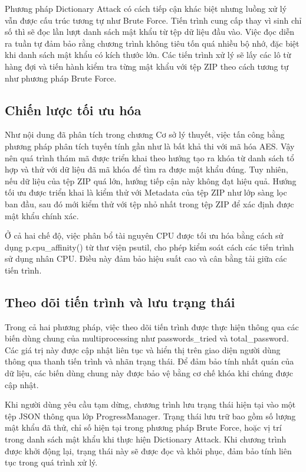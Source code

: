 \documentclass[../DoAn.tex]{subfiles}
\begin{document}
Phương pháp Dictionary Attack có cách tiếp cận khác biệt nhưng luồng xử lý vẫn được cấu trúc tương tự như Brute Force. Tiến trình cung cấp thay vì sinh chỉ số thì sẽ đọc lần lượt danh sách mật khẩu từ tệp dữ liệu đầu vào. Việc đọc diễn ra tuần tự đảm bảo rằng chương trình không tiêu tốn quá nhiều bộ nhớ, đặc biệt khi danh sách mật khẩu có kích thước lớn. Các tiến trình xử lý sẽ lấy các lô từ hàng đợi và tiến hành kiểm tra từng mật khẩu với tệp ZIP theo cách tương tự như phương pháp Brute Force.

\subsection{Chiến lược tối ưu hóa}

Như nội dung đã phân tích trong chương Cơ sở lý thuyết, việc tấn công bằng phương pháp phân tích tuyến tính gần như là bất khả thi với mã hóa AES. Vậy nên quá trình thám mã được triển khai theo hướng tạo ra khóa từ danh sách tổ hợp và thử với dữ liệu đã mã khóa để tìm ra được mật khẩu đúng. Tuy nhiên, nếu dữ liệu của tệp ZIP quá lớn, hướng tiếp cận này không đạt hiệu quả. Hướng tối ưu được triển khai là kiểm thử với Metadata của tệp ZIP như lớp sàng lọc ban đầu, sau đó mới kiểm thử với tệp nhỏ nhất trong tệp ZIP để xác định được mật khẩu chính xác. 

Ở cả hai chế độ, việc phân bổ tài nguyên CPU được tối ưu hóa bằng cách sử dụng p.cpu\_affinity() từ thư viện psutil, cho phép kiểm soát cách các tiến trình sử dụng nhân CPU. Điều này đảm bảo hiệu suất cao và cân bằng tải giữa các tiến trình.

\subsection{Theo dõi tiến trình và lưu trạng thái}

Trong cả hai phương pháp, việc theo dõi tiến trình được thực hiện thông qua các biến dùng chung của multiprocessing như passwords\_tried và total\_password. Các giá trị này được cập nhật liên tục và hiển thị trên giao diện người dùng thông qua thanh tiến trình và nhãn trạng thái. Để đảm bảo tính nhất quán của dữ liệu, các biến dùng chung này được bảo vệ bằng cơ chế khóa khi chúng được cập nhật.

Khi người dùng yêu cầu tạm dừng, chương trình lưu trạng thái hiện tại vào một tệp JSON thông qua lớp ProgressManager. Trạng thái lưu trữ bao gồm số lượng mật khẩu đã thử, chỉ số hiện tại trong phương pháp Brute Force, hoặc vị trí trong danh sách mật khẩu khi thực hiện Dictionary Attack. Khi chương trình được khởi động lại, trạng thái này sẽ được đọc và khôi phục, đảm bảo tính liên tục trong quá trình xử lý.
\end{document}
